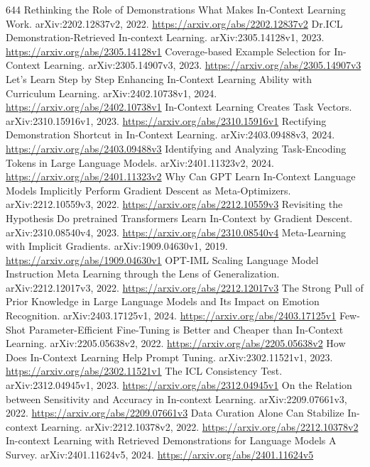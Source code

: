\documentclass[11pt]{article}
\begin{document}
\begin{thebibliography}{644}
 Rethinking the Role of Demonstrations What Makes In-Context Learning Work. arXiv:2202.12837v2, 2022. \url{https://arxiv.org/abs/2202.12837v2}
 Dr.ICL Demonstration-Retrieved In-context Learning. arXiv:2305.14128v1, 2023. \url{https://arxiv.org/abs/2305.14128v1}
 Coverage-based Example Selection for In-Context Learning. arXiv:2305.14907v3, 2023. \url{https://arxiv.org/abs/2305.14907v3}
 Let's Learn Step by Step Enhancing In-Context Learning Ability with Curriculum Learning. arXiv:2402.10738v1, 2024. \url{https://arxiv.org/abs/2402.10738v1}
 In-Context Learning Creates Task Vectors. arXiv:2310.15916v1, 2023. \url{https://arxiv.org/abs/2310.15916v1}
 Rectifying Demonstration Shortcut in In-Context Learning. arXiv:2403.09488v3, 2024. \url{https://arxiv.org/abs/2403.09488v3}
 Identifying and Analyzing Task-Encoding Tokens in Large Language Models. arXiv:2401.11323v2, 2024. \url{https://arxiv.org/abs/2401.11323v2}
 Why Can GPT Learn In-Context Language Models Implicitly Perform Gradient Descent as Meta-Optimizers. arXiv:2212.10559v3, 2022. \url{https://arxiv.org/abs/2212.10559v3}
 Revisiting the Hypothesis Do pretrained Transformers Learn In-Context by Gradient Descent. arXiv:2310.08540v4, 2023. \url{https://arxiv.org/abs/2310.08540v4}
 Meta-Learning with Implicit Gradients. arXiv:1909.04630v1, 2019. \url{https://arxiv.org/abs/1909.04630v1}
 OPT-IML Scaling Language Model Instruction Meta Learning through the Lens of Generalization. arXiv:2212.12017v3, 2022. \url{https://arxiv.org/abs/2212.12017v3}
 The Strong Pull of Prior Knowledge in Large Language Models and Its Impact on Emotion Recognition. arXiv:2403.17125v1, 2024. \url{https://arxiv.org/abs/2403.17125v1}
 Few-Shot Parameter-Efficient Fine-Tuning is Better and Cheaper than In-Context Learning. arXiv:2205.05638v2, 2022. \url{https://arxiv.org/abs/2205.05638v2}
 How Does In-Context Learning Help Prompt Tuning. arXiv:2302.11521v1, 2023. \url{https://arxiv.org/abs/2302.11521v1}
 The ICL Consistency Test. arXiv:2312.04945v1, 2023. \url{https://arxiv.org/abs/2312.04945v1}
 On the Relation between Sensitivity and Accuracy in In-context Learning. arXiv:2209.07661v3, 2022. \url{https://arxiv.org/abs/2209.07661v3}
 Data Curation Alone Can Stabilize In-context Learning. arXiv:2212.10378v2, 2022. \url{https://arxiv.org/abs/2212.10378v2}
 In-context Learning with Retrieved Demonstrations for Language Models A Survey. arXiv:2401.11624v5, 2024. \url{https://arxiv.org/abs/2401.11624v5}

\end{thebibliography}
\end{document}
